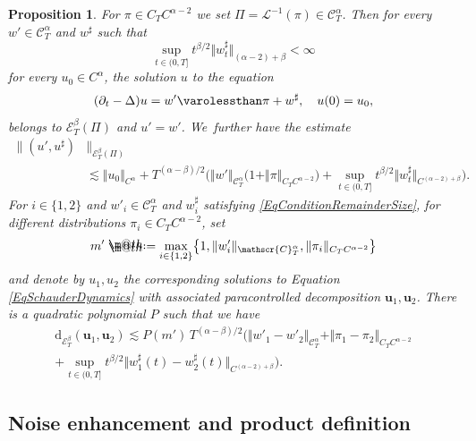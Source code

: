 \documentclass[JEP,XML,SOM,Unicode,published]{cedram}
\makeatletter
\newtheorem{prop}[thm]{Proposition}
\theoremstyle{definition}
\newcommand{\mcE}{\mathcal{E}}
\newcommand{\bsu}{\boldsymbol{u}}
\newcommand{\scrC}{\ensuremath{\mathscr{C}}}
\newcommand*{\defeq}{\mathrel{\rlap{%
\raisebox{0.3ex}{$\m@th\cdot$}}%
\raisebox{-0.3ex}{$\m@th\cdot$}}%
=}
\newcommand{\norme}[1]{\Vert #1 \Vert}
\newcommand{\scrL}{\mathscr{L}}
\makeatother
\begin{document}
\begin{prop} \label{schauder3}
For $\pi\in C_TC^{\alpha-2}$ we set $\Pi=\scrL^{-1}(\pi)\in\scrC^\alpha_T$. Then for every $w'\in\scrC^\alpha_T$ and $w^\sharp$ such that
\begin{equation} \label{EqConditionRemainderSize}
\sup_{t\in(0,T]} t^{\beta/2}\big\Vert w_t^\sharp\big\Vert_{(\alpha-2)+\beta} < \infty
\end{equation}
for every $u_0\in C^\alpha$, the solution $u$ to the equation
\begin{equation} \label{EqSchauderDynamics}
(\partial_t-\Delta)u = w' \varolessthan \pi + w^\sharp, \quad u(0)=u_0,
\end{equation}
belongs to $\mcE^\beta_T(\Pi)$ and $u'=w'$. We~further have the estimate
\begin{equation*} \begin{split}
\big\| (u',u^\sharp) &\big\|_{\mcE^\beta_T(\Pi)} \\
&\lesssim \norme{u_0}_{C^\alpha} + T^{(\alpha-\beta)/2}\bigl( \norme{w'}_{\scrC^\alpha_T}\bigl(1+\norme{\pi}_{C_TC^{\alpha-2}}\bigr) + \sup_{t\in(0,T]} t^{\beta/2}\big\Vert w^\sharp_t\big\Vert_{C^{(\alpha-2)+\beta}} \bigr).
\end{split} \end{equation*}
For $i\in\{1,2\}$ and $w'_i \in \scrC^\alpha_T$ and $w^\sharp_i$ satisfying \eqref{EqConditionRemainderSize}, for different distributions $\pi_i\in C_TC^{\alpha-2}$, set
\[
m' \defeq \max_{i\in\{1,2\}} \bigl\{1,\Vert w'_{i}\Vert_{\scrC^\alpha_T}, \norme{\pi_i}_{C_TC^{\alpha-2}}\bigr\}
\]
and denote by $u_1,u_2$ the corresponding solutions to Equation \eqref{EqSchauderDynamics} with associated paracontrolled decomposition $\bsu_1, \bsu_2$. There is a quadratic polynomial $P$ such that we have
\begin{multline*}
\text{d}_{\mcE^\beta_T}(\bsu_1, \bsu_2) \lesssim P(m') \, T^{(\alpha-\beta)/2}\bigl(\norme{w'_1 - w'_2}_{\scrC^\alpha_T} + \Vert \pi_1-\pi_2\Vert_{C_TC^{\alpha-2}} \\
+ \sup_{t\in (0,T]}t^{\beta/2}\big\Vert w_1^\sharp(t) - w_2^\sharp(t)\big\Vert_{C^{(\alpha-2)+\beta}} \bigr).
\end{multline*}
\end{prop}

\subsection{Noise enhancement and product definition}
\label{SectionNoiseEnhancement}
\end{document}
